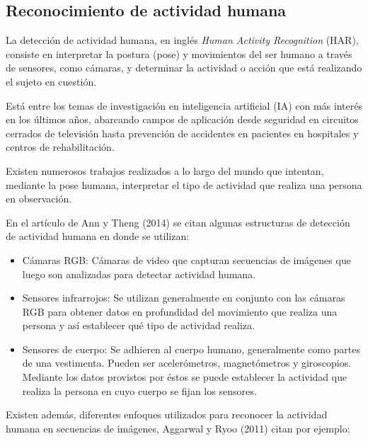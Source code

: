\documentclass[a4paper,12pt,oneside,spanish]{book}
\begin{document}
\subsection{Reconocimiento de actividad humana}

La detección de actividad humana, en inglés \textit{Human Activity Recognition} (HAR), consiste en interpretar la postura (pose) y movimientos del ser humano a través de sensores, como cámaras, y determinar la actividad o acción que está realizando el sujeto en cuestión.\par

Está entre los temas de investigación en inteligencia artificial (IA) con más interés en los últimos años, abarcando campos de aplicación  desde seguridad en circuitos cerrados de televisión hasta prevención de accidentes en pacientes en hospitales y centros de rehabilitación.\par

Existen numerosos trabajos realizados a lo largo del mundo que intentan, mediante la pose humana, interpretar el tipo de actividad que realiza una persona en observación. \par

En el artículo de Ann y Theng (2014) se citan algunas estructuras de detección de actividad humana en donde se utilizan:
\begin{itemize}
	\setlength\itemsep{-1.2em}
	\item Cámaras RGB: Cámaras de video que capturan secuencias de imágenes que luego son analizadas para detectar actividad humana.\\	
	\item Sensores infrarrojos: Se utilizan generalmente en conjunto con las cámaras RGB para obtener datos en profundidad del movimiento que realiza una persona y así establecer qué tipo de actividad realiza.\\	
	\item Sensores de cuerpo: Se adhieren al cuerpo humano, generalmente como partes de una vestimenta. Pueden ser acelerómetros, magnetómetros y giroscopios. Mediante los datos provistos por éstos se puede establecer la actividad que realiza la persona en cuyo cuerpo se fijan los sensores.\\
\end{itemize}
 
Existen además, diferentes enfoques utilizados para reconocer la actividad humana en secuencias de imágenes, Aggarwal y Ryoo (2011) citan por ejemplo:
\end{document}
